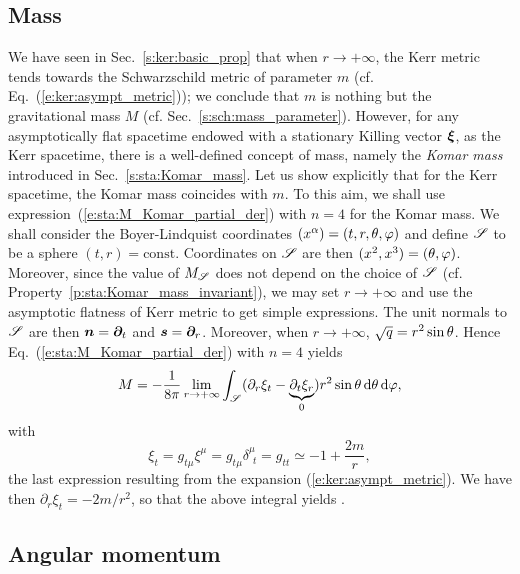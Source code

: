 \subsection{Mass} \label{s:ker:Komar_mass}

We have seen in Sec.~\ref{s:ker:basic_prop} that when
$r\rightarrow +\infty$, the Kerr metric tends towards the Schwarzschild
metric of parameter $m$ (cf. Eq.~(\ref{e:ker:asympt_metric}));
we conclude that $m$ is nothing but the gravitational mass $M$ (cf.
Sec.~\ref{s:sch:mass_parameter}).
However, for any asymptotically flat spacetime endowed with
a stationary Killing vector $\bm{\xi}$, as the Kerr spacetime,
there is a well-defined concept of mass, namely the \emph{Komar mass}
introduced in Sec.~\ref{s:sta:Komar_mass}.
Let us show explicitly that for the Kerr spacetime, the Komar mass coincides with $m$.
To this aim, we shall use expression~(\ref{e:sta:M_Komar_partial_der}) with $n=4$
for the Komar mass. We shall consider the Boyer-Lindquist coordinates
$(x^\alpha) = (t,r,\theta,\varphi)$ and define $\mathscr{S}$ to be a sphere
$(t,r)=\mathrm{const}$. Coordinates on $\mathscr{S}$ are then
$(x^2,x^3)=(\theta,\varphi)$. Moreover, since the value of $M_{\mathscr{S}}$ does not depend on
the choice of $\mathscr{S}$ (cf. Property~\ref{p:sta:Komar_mass_invariant}),
we may set $r\rightarrow +\infty$ and use the
asymptotic flatness of Kerr metric to get simple expressions. The unit normals
to $\mathscr{S}$ are then $\bm{n} = \bm{\partial}_t$ and $\bm{s} = \bm{\partial}_r$. Moreover, when
$r\rightarrow +\infty$, $\sqrt{q} = r^2\sin\theta$. Hence Eq.~(\ref{e:sta:M_Komar_partial_der})
with $n=4$ yields
\[
    M = -\frac{1}{8\pi} \lim_{r\rightarrow +\infty}
        \int_{\mathscr{S}}
        (\partial_r \xi_t - \underbrace{\partial_t \xi_r}_{0} )
        r^2\sin\theta \, \mathrm{d}\theta\, \mathrm{d}\varphi ,
\]
with
\[
    \xi_t = g_{t\mu} \xi^\mu = g_{t\mu} \delta^\mu_{\ \, t}
        = g_{tt} \simeq - 1 + \frac{2m}{r} ,
\]
the last expression resulting from the expansion (\ref{e:ker:asympt_metric}).
We have then $\partial_r \xi_t = -2m/r^2$, so that the above integral yields
\be \label{e:ker:M_m}
     .
\ee


\subsection{Angular momentum} \label{s:ker:Komar_J}

